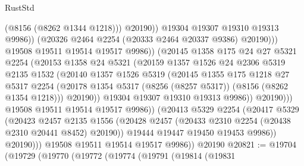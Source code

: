 \begin{lexlean}{RustStd}
\begin{coremodule}
{\begin{coremodule}
{{{{{{{{{{{{{{{{{{{{{{{{{{{{{{{{{{                                      (@8156 (@8262 @1344 @1218)))
                                    @20190))
                                @19304
                                @19307
                                @19310
                                @19313
                                @9986))
                            (@20326 @2464 @2254 (@20333 @2464 @20337 @9386) @20190)))
                        @19508
                        @19511
                        @19514
                        @19517
                        @9986))
                    (@20145
                      @1358
                      @175
                      @24
                      @27
                      @5321
                      @2254
                      (@20153
                        @1358
                        @24
                        @5321
                        (@20159
                          @1357
                          @1526
                          @24
                          @2306
                          @5319
                          @2135
                          @1532
                          (@20140
                            @1357
                            @1526
                            @5319
                            (@20145
                              @1355
                              @175
                              @1218
                              @27
                              @5317
                              @2254
                              (@20178 @1354 @5317 (@8256 (@8257 @5317)) (@8156 (@8262 @1354 @1218)))
                              @20190))
                          @19304
                          @19307
                          @19310
                          @19313
                          @9986))
                      @20190)))
                @19508
                @19511
                @19514
                @19517
                @9986))
            (@20413
              @5329
              @2254
              (@20417
                @5329
                (@20423
                  @2457
                  @2135
                  @1556
                  (@20428 @2457 (@20433 @2310 @2254 (@20438 @2310 @20441 @8452) @20190))
                  @19444
                  @19447
                  @19450
                  @19453
                  @9986))
              @20190)))
        @19508
        @19511
        @19514
        @19517
        @9986))
    @20190
@20821 := @19704
    (@19729
      (@19770
        (@19772
          (@19774
            (@19791
              (@19814
                (@19831
}}}}}}}}}}}}}}}}}}}}}}}}}}}}}}}}}}
\end{coremodule}}
\end{coremodule}
\end{lexlean}
